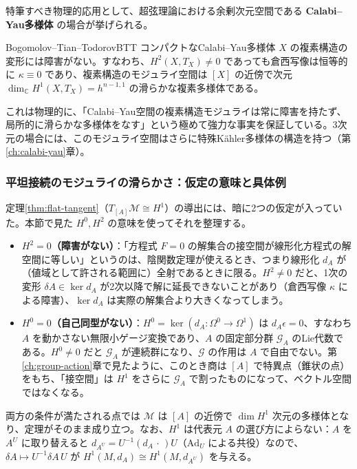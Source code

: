 \documentclass[uplatex, dvipdfmx, book]{jsbook}
\let\origsubsubsection\subsubsection
\renewcommand{\subsection}{\origsubsubsection}
\renewcommand{\subsubsection}{\paragraph}
\begin{document}
特筆すべき物理的応用として、超弦理論における余剰次元空間である \textbf{Calabi--Yau多様体} の場合が挙げられる\cite{tian1987,todorov1989}。

\begin{mythm}{Bogomolov--Tian--Todorov}{BTT}
コンパクトなCalabi--Yau多様体 $X$ の複素構造の変形には障害がない。すなわち、$H^2(X, T_X) \neq 0$ であっても倉西写像は恒等的に $\kappa \equiv 0$ であり、複素構造のモジュライ空間は $[X]$ の近傍で次元 $\dim_{\mathbb{C}} H^1(X, T_X) = h^{n-1,1}$ の滑らかな複素多様体である。
\end{mythm}

これは物理的に、「Calabi--Yau空間の複素構造モジュライは常に障害を持たず、局所的に滑らかな多様体をなす」という極めて強力な事実を保証している。3次元の場合には、このモジュライ空間はさらに特殊K\"ahler多様体の構造を持つ（第\ref{ch:calabi-yau}章）。

\subsection{平坦接続のモジュライの滑らかさ：仮定の意味と具体例}
\label{sec:smoothness-flat}

定理\ref{thm:flat-tangent}（$T_{[A]}\mathcal{M} \cong H^1$）の導出には、暗に2つの仮定が入っていた。本節で見た $H^0, H^2$ の意味を使ってそれを整理する。
\begin{itemize}
    \item \textbf{$H^2 = 0$（障害がない）}：「方程式 $F = 0$ の解集合の接空間が線形化方程式の解空間に等しい」というのは、陰関数定理が使えるとき、つまり線形化 $d_A$ が（値域として許される範囲に）全射であるときに限る。$H^2 \neq 0$ だと、1次の変形 $\delta A \in \ker d_A$ が2次以降で解に延長できないことがあり（倉西写像 $\kappa$ による障害）、$\ker d_A$ は実際の解集合より大きくなってしまう。
    \item \textbf{$H^0 = 0$（自己同型がない）}：$H^0 = \ker(d_A:\Omega^0 \to \Omega^1)$ は $d_A\epsilon = 0$、すなわち $A$ を動かさない無限小ゲージ変換であり、$A$ の固定部分群 $\mathcal{G}_A$ のLie代数である。$H^0 \neq 0$ だと $\mathcal{G}_A$ が連続群になり、$\mathcal{G}$ の作用は $A$ で自由でない。第\ref{ch:group-action}章で見たように、このとき商は $[A]$ で特異点（錐状の点）をもち、「接空間」は $H^1$ をさらに $\mathcal{G}_A$ で割ったものになって、ベクトル空間ではなくなる。
\end{itemize}
両方の条件が満たされる点では $\mathcal{M}$ は $[A]$ の近傍で $\dim H^1$ 次元の多様体となり、定理がそのまま成り立つ。なお、$H^1$ は代表元 $A$ の選び方によらない：$A$ を $A^U$ に取り替えると $d_{A^U} = U^{-1}(d_A\,\cdot\,)U$（$\mathrm{Ad}_U$ による共役）なので、$\delta A \mapsto U^{-1}\delta A\,U$ が $H^1(M, d_A) \cong H^1(M, d_{A^U})$ を与える。
\end{document}
